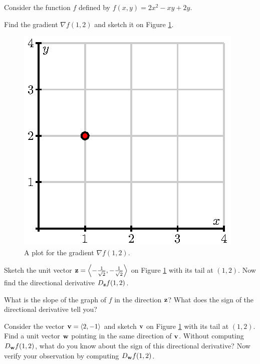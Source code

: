 \begin{activity} \label{A:10.6.11} 
  Consider the function $f$ defined by $f(x,y) = 2x^2 - xy + 2y$.  
  \ba
\item Find the gradient $\nabla f(1,2)$ and sketch it on Figure
  \ref{F:10.6.activity.empty}. 

  \begin{figure}[ht]
    \begin{center}
      \includegraphics{figures/fig_10_6_activity_empty.eps}
    \end{center}	
    \caption{A plot for the gradient $\nabla f(1,2)$.}
    \label{F:10.6.activity.empty}
  \end{figure}

\item Sketch the unit vector $\mathbf{z} = \left\langle-\frac1{\sqrt{2}},
    -\frac1{\sqrt{2}}\right\rangle$ on Figure
  \ref{F:10.6.activity.empty} with its tail at $(1,2)$.
  Now find the directional derivative $D_{\mathbf{z}}f(1,2)$.  

\item What is the slope of the graph of $f$ in the direction $\mathbf{z}$?  
  What does the sign of the directional derivative tell you?  

\item Consider the vector $\mathbf{v} = \langle 2,-1\rangle$ and sketch $\mathbf{v}$
  on Figure \ref{F:10.6.activity.empty} with its tail at $(1,2)$.
  Find a unit vector $\mathbf{w}$ pointing in the same direction of $\mathbf{v}$.
  Without computing $D_{\mathbf{w}}f(1,2)$, what do you know about the sign
  of this directional derivative?  Now verify your observation by
  computing $D_{\mathbf{w}}f(1,2)$.


\end{activity}
